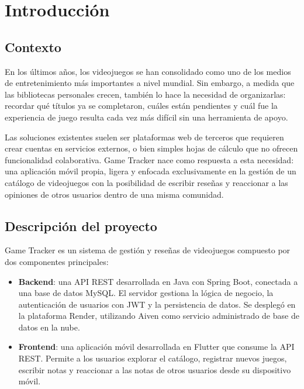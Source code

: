 
\chapter{Introducción}

\section{Contexto}

En los últimos años, los videojuegos se han consolidado como uno de los medios
de entretenimiento más importantes a nivel mundial. Sin embargo, a medida que
las bibliotecas personales crecen, también lo hace la necesidad de organizarlas:
recordar qué títulos ya se completaron, cuáles están pendientes y cuál fue la
experiencia de juego resulta cada vez más difícil sin una herramienta de apoyo.

Las soluciones existentes suelen ser plataformas web de terceros que requieren
crear cuentas en servicios externos, o bien simples hojas de cálculo que no
ofrecen funcionalidad colaborativa. Game Tracker nace como respuesta a esta
necesidad: una aplicación móvil propia, ligera y enfocada exclusivamente en la
gestión de un catálogo de videojuegos con la posibilidad de escribir reseñas y
reaccionar a las opiniones de otros usuarios dentro de una misma comunidad.

\section{Descripción del proyecto}

Game Tracker es un sistema de gestión y reseñas de videojuegos compuesto por
dos componentes principales:

\begin{itemize}
    \item \textbf{Backend}: una API REST desarrollada en Java con Spring Boot,
    conectada a una base de datos MySQL. El servidor gestiona la lógica de
    negocio, la autenticación de usuarios con JWT y la persistencia de datos.
    Se desplegó en la plataforma Render, utilizando Aiven como servicio
    administrado de base de datos en la nube.

    \item \textbf{Frontend}: una aplicación móvil desarrollada en Flutter que
    consume la API REST. Permite a los usuarios explorar el catálogo, registrar
    nuevos juegos, escribir notas y reaccionar a las notas de otros usuarios
    desde su dispositivo móvil.
\end{itemize}

